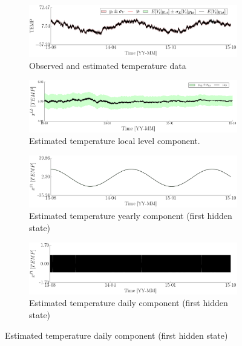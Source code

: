 \begin{figure}[h!]
\ContinuedFloat
\begin{subfigure}{\linewidth}
\includegraphics[width=0.9\linewidth]{./docfigs/Example_DISPTEMPSIM/optim_param_optim_initialhiddenstate/TEMP_ObservedPredicted.pdf} 
\caption{Observed and estimated temperature data}
\end{subfigure}
\begin{subfigure}{\linewidth}
\includegraphics[width=0.9\linewidth]{./docfigs/Example_DISPTEMPSIM/optim_param_optim_initialhiddenstate/TEMP_LL_1.pdf} 
\caption{Estimated temperature local level component.}
\end{subfigure}
\begin{subfigure}{\linewidth}
\includegraphics[width=0.9\linewidth]{./docfigs/Example_DISPTEMPSIM/optim_param_optim_initialhiddenstate/TEMP_S1_2.pdf} 
\caption{Estimated temperature yearly component (first hidden state)}
\end{subfigure}
\begin{subfigure}{\linewidth}
\includegraphics[width=0.9\linewidth]{./docfigs/Example_DISPTEMPSIM/optim_param_optim_initialhiddenstate/TEMP_S1_4.pdf} 
\caption{Estimated temperature daily component (first hidden state)}

\end{subfigure}
\end{figure}
